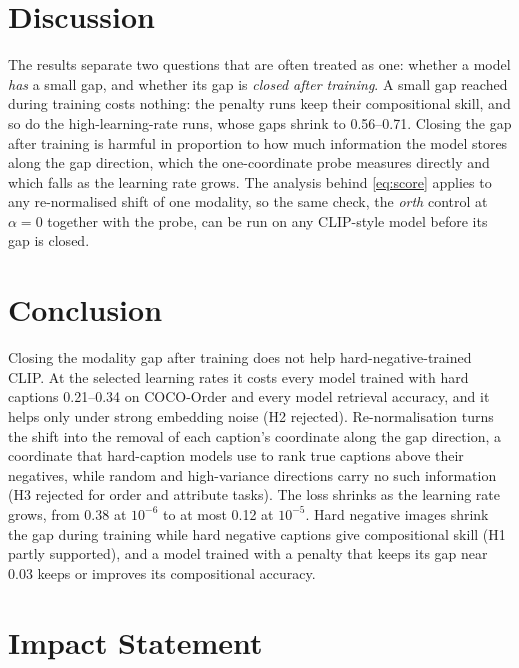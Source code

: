 \documentclass{article}
\begin{document}
\FloatBarrier
\section{Discussion}
\label{sec:discussion}

The results separate two questions that are often treated as one: whether a model \emph{has} a small gap, and whether its gap is \emph{closed after training}. A small gap reached during training costs nothing: the penalty runs keep their compositional skill, and so do the high-learning-rate runs, whose gaps shrink to 0.56--0.71. Closing the gap after training is harmful in proportion to how much information the model stores along the gap direction, which the one-coordinate probe measures directly and which falls as the learning rate grows. The analysis behind \cref{eq:score} applies to any re-normalised shift of one modality, so the same check, the \emph{orth} control at $\alpha{=}0$ together with the probe, can be run on any CLIP-style model before its gap is closed.

\section{Conclusion}
\label{sec:conclusion}

Closing the modality gap after training does not help hard-negative-trained CLIP. At the selected learning rates it costs every model trained with hard captions 0.21--0.34 on COCO-Order and every model retrieval accuracy, and it helps only under strong embedding noise (H2 rejected). Re-normalisation turns the shift into the removal of each caption's coordinate along the gap direction, a coordinate that hard-caption models use to rank true captions above their negatives, while random and high-variance directions carry no such information (H3 rejected for order and attribute tasks). The loss shrinks as the learning rate grows, from 0.38 at $10^{-6}$ to at most 0.12 at $10^{-5}$. Hard negative images shrink the gap during training while hard negative captions give compositional skill (H1 partly supported), and a model trained with a penalty that keeps its gap near 0.03 keeps or improves its compositional accuracy.

\section*{Impact Statement}
\end{document}
